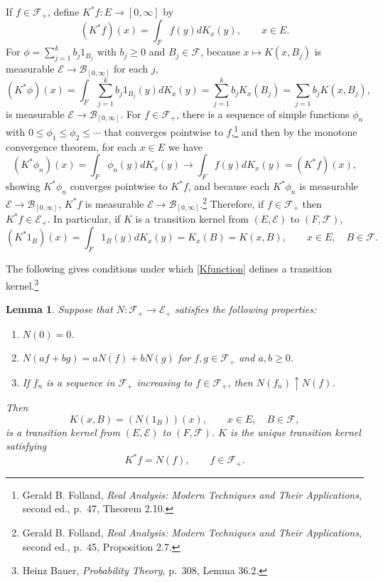 \documentclass{article}
\newtheorem{lemma}[theorem]{Lemma}
\theoremstyle{definition}
\begin{document}
If $f \in \mathscr{F}_+$, define $K^*f:E \to [0,\infty]$ by
\begin{equation}
(K^* f)(x) = \int_F f(y) dK_x(y), \qquad x \in E.
\label{Kxdef}
\end{equation}
For  $\phi=\sum_{j=1}^k b_j 1_{B_j}$ with $b_j \geq 0$ and $B_j \in \mathscr{F}$,
because $x \mapsto K(x,B_j)$ is measurable $\mathscr{E} \to \mathscr{B}_{[0,\infty]}$ for each $j$,
\[
(K^*\phi)(x) = \int_F \sum_{j=1}^k b_j 1_{B_j}(y) dK_x(y) = \sum_{j=1}^k b_j K_x(B_j)
=\sum_{j=1} b_j K(x,B_j),
\]
is measurable $\mathscr{E} \to \mathscr{B}_{[0,\infty]}$. 
For $f \in \mathscr{F}_+$, there is a sequence
of simple functions $\phi_n$ with $0\leq \phi_1 \leq \phi_2 \leq \cdots$ that converges pointwise to $f$,\footnote{Gerald B. Folland,
{\em Real Analysis: Modern Techniques and Their Applications}, second ed., p.~47, Theorem 2.10.} and then
by the monotone convergence theorem, for each $x \in E$ we have
\[
(K^*\phi_n)(x) =  \int_F \phi_n(y) dK_x(y) \to \int_F f(y) dK_x(y) = (K^*f)(x),
\]
showing $K^* \phi_n$ converges pointwise to $K^* f$, and because each $K^* \phi_n$ is measurable $\mathscr{E} \to \mathscr{B}_{[0,\infty]}$,
$K^* f$ is measurable $\mathscr{E} \to \mathscr{B}_{[0,\infty]}$.\footnote{Gerald B. Folland,
{\em Real Analysis: Modern Techniques and Their Applications}, second ed., p.~45, Proposition 2.7.}
Therefore, if $f \in \mathscr{F}_+$ then $K^* f \in \mathscr{E}_+$.
In particular, if $K$ is a transition kernel from $(E,\mathscr{E})$ to $(F,\mathscr{F})$,
\begin{equation}
(K^* 1_B)(x) = \int_F 1_B(y) dK_x(y) = K_x(B) = K(x,B), \qquad x \in E, \quad B \in \mathscr{F}.
\label{Kfunction}
\end{equation}



The following  gives conditions under which 
\eqref{Kfunction} defines a transition kernel.\footnote{Heinz Bauer, {\em Probability Theory},
p.~308, Lemma 36.2.}

\begin{lemma}
Suppose that $N:\mathscr{F}_+ \to \mathscr{E}_+$ satisfies the following properties:
\begin{enumerate}
\item $N(0)=0$.
\item $N(af+bg)=aN(f)+bN(g)$ for $f,g \in \mathscr{F}_+$ and $a,b \geq 0$.
\item If $f_n$ is a sequence in $\mathscr{F}_+$ increasing to $f \in \mathscr{F}_+$, then 
$N(f_n) \uparrow N(f)$.
\end{enumerate}
Then 
\[
K(x,B) = (N(1_B))(x), \qquad x \in E, \quad B \in \mathscr{F},
\]
is a transition kernel
from $(E,\mathscr{E})$ to $(F,\mathscr{F})$. $K$ is the unique transition kernel satisfying
\[
K^* f = N(f), \qquad f \in \mathscr{F}_+.
\]
\label{kernel}
\end{lemma}
\end{document}
